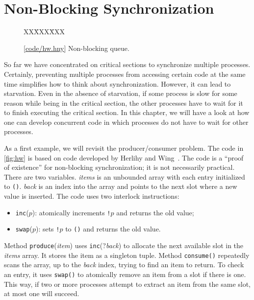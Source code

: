 \documentclass{report}
\newcommand{\harmonysource}[1]{
\begin{tabbing}
XX\=XXX\=XXX\kill
    
\end{tabbing}
}
\newcommand{\harmonylink}[1]{%
[\href{https://www.cs.cornell.edu/home/rvr/harmony/#1}{\underline{#1}}]%
}
\newenvironment{code}{
\tcolorbox
}{
\endtcolorbox
}
\begin{document}
\chapter{Non-Blocking Synchronization}
\label{ch:nonblocking}
%

%

\begin{figure}
\begin{code}
\harmonysource{hw}
\end{code}
\caption{\harmonylink{code/hw.hny} Non-blocking queue.}
\label{fig:hw}
\end{figure}

So far we have concentrated on critical sections to synchronize multiple
processes.  Certainly, preventing multiple processes from accessing
certain code at the same time simplifies how to think about synchronization.
However, it can lead to starvation.  Even in the absence of starvation,
if some process is slow for some reason while being in the critical section,
the other processes have to wait for it to finish executing the critical section.
In this chapter, we will have a look at how one can develop concurrent
code in which processes do not have to wait for other processes.

As a first example, we will revisit the producer/consumer problem.
The code in \autoref{fig:hw} is based on code developed by Herlihy and
Wing~\cite{HW87}.
The code is a ``proof of existence'' for non-blocking synchronization; it
is not necessarily practical.
There are two variables.  \textit{items} is an unbounded array with each
entry initialized to \texttt{()}.  \textit{back} is an index into the
array and points to the next slot where a new value is inserted.
The code uses two interlock instructions:
\begin{itemize}
\item \texttt{inc}($p$): atomically increments \texttt{!{}}$p$ and returns
the old value;
\item \texttt{swap}($p$): sets \texttt{!{}}$p$ to \texttt{()} and returns
the old value.
\end{itemize}

Method \texttt{produce}(\textit{item}) uses \texttt{inc}(?\textit{back})
to allocate
the next available slot in the \textit{items} array.
It stores the item as a singleton tuple.
Method \texttt{consume()} repeatedly scans the array, up to the
\textit{back} index, trying to find an item to return.
To check an entry, it uses \texttt{swap()}
to atomically remove an item from a slot if there is one.
This way, if two or more processes attempt to extract an item from
the same slot, at most one will succeed.
\end{document}

